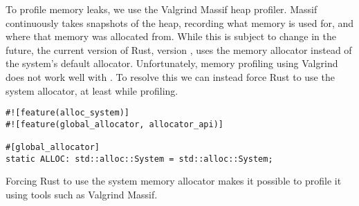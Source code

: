 To profile memory leaks, we use the Valgrind
Massif heap profiler.
Massif continuously takes snapshots of the heap, recording what memory is used
for, and where that memory was allocated from. While this is subject to change
in the future, the current version of Rust, version , uses the
 memory allocator instead of the
system's default allocator. Unfortunately, memory profiling using Valgrind does
not work well with . To resolve this we can instead force Rust to
use the system allocator, at least while profiling.

\begin{listing}[H]
  \begin{verbatim}
#![feature(alloc_system)]
#![feature(global_allocator, allocator_api)]

#[global_allocator]
static ALLOC: std::alloc::System = std::alloc::System;
  \end{verbatim}

  \caption{Forcing Rust to use the system memory allocator makes it possible to
  profile it using tools such as Valgrind Massif.}\label{lst:system-alloc}
\end{listing}

